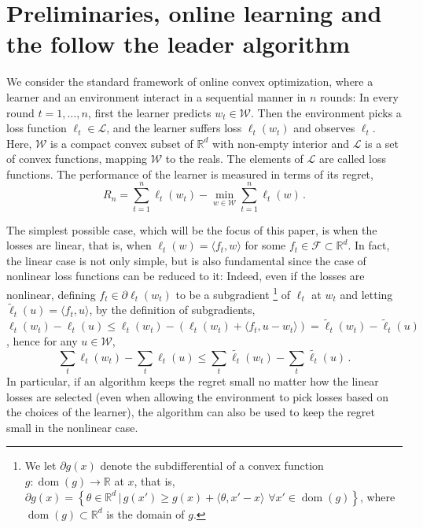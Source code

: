 \documentclass[english]{article}
\newcommand{\cW}{\mathcal{W}}
\newcommand{\cF}{\mathcal{F}}
\newcommand{\cL}{\mathcal{L}}
\newcommand{\real}{\mathbb{R}}
\newcommand{\R}{\mathbb{R}}
\newcommand{\ip}[1]{\langle#1\rangle}
\newcommand{\set}[2]{\left\{#1 \,\vert\, #2 \right\}}
\newcommand{\lt}{\ell_t}
\DeclareMathOperator{\dom}{dom}
\begin{document}
\section{Preliminaries, online learning and the follow the leader algorithm}
\label{sec:notation}
We consider the standard framework of online convex optimization, where a learner and an environment interact in a sequential manner in $n$ rounds: In  every round $t=1,\ldots,n$, first the learner predicts $w_t\in \cW$. Then the environment picks a loss function $\ell_t\in \cL$, and the learner suffers loss $\ell_t(w_t)$ and observes $\ell_t$. 
Here, $\cW$ is a  compact convex subset of $\real^d$ with non-empty interior and
 $\cL$ is a set of convex functions, mapping $\cW$ to the reals.
 The elements of $\cL$ are called loss functions.
The performance of the learner is measured in terms of its regret,
\[
R_n = \sum_{t=1}^n \lt(w_t) - \min_{w\in \cW}\sum_{t=1}^n \lt(w)\,.
\]
 
The simplest possible case, which will be the focus of this paper,
is when the losses are linear, that is, when $\lt(w) = \ip{f_t,w}$ for some $f_t\in \cF\subset \real^d$.
\newcommand{\tlt}{\tilde{\ell}_t}
In fact, the linear case is not only simple, but is also fundamental since the case of nonlinear loss functions can be reduced to it: Indeed, even if the losses are nonlinear, 
defining $f_t \in \partial \lt(w_t)$ to be a subgradient%
\footnote{
We let $\partial g(x)$ denote the subdifferential of a convex function $g:\dom(g) \to \R$ at $x$,
that is, $\partial g(x) = \set{\theta\in \R^d}{g(x') \ge g(x) + \ip{\theta, x'-x} \,\, \forall x'\in \dom(g) }$,
where $\dom(g)\subset \R^d$ is the domain of $g$.
} 
of $\lt$ at $w_t$ and  letting $\tlt(u) = \ip{f_t,u}$, by the definition of subgradients,
$\lt(w_t)-\lt(u) \le \lt(w_t)-(\lt(w_t)+\ip{f_t,u-w_t}) = \tlt(w_t)-\tlt(u)$, hence for any $u\in \cW$,
\[
\sum_t \lt(w_t) - \sum_t \lt(u) \le \sum_t \tilde{\lt}(w_t) - \sum_t \tilde{\lt}(u)\,.
\]
In particular, if an algorithm keeps the regret small no matter how the linear losses are selected
(even when allowing the environment to pick losses based on the choices of the learner), 
the algorithm can also be used to keep the regret small in the nonlinear case. 
\end{document}
